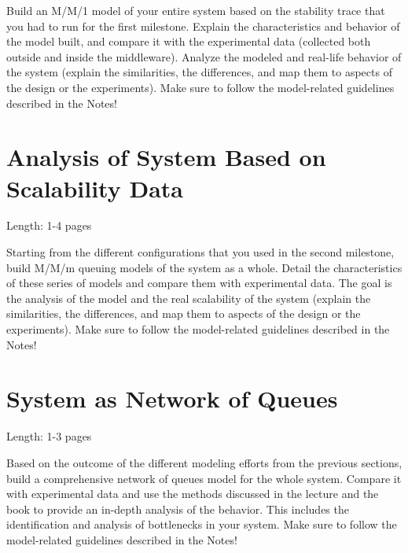 \documentclass[11pt]{article}
\begin{document}
Build an M/M/1 model of your entire system based on the stability trace that you had to run for the first milestone. Explain the characteristics and behavior of the model built, and compare it with the experimental data (collected both outside and inside the middleware). Analyze the modeled and real-life behavior of the system (explain the similarities, the differences, and map them to aspects of the design or the experiments). Make sure to follow the model-related guidelines described in the Notes!



\clearpage
\section{Analysis of System Based on Scalability Data}\label{sec:analysis-scalability}

Length: 1-4 pages

Starting from the different configurations that you used in the second milestone, build M/M/m queuing models of the system as a whole. Detail the characteristics of these series of models and compare them with experimental data. The goal is the analysis of the model and the real scalability of the system (explain the similarities, the differences, and map them to aspects of the design or the experiments). Make sure to follow the model-related guidelines described in the Notes!

\clearpage
\section{System as Network of Queues}\label{sec:network-of-queues}

Length: 1-3 pages

Based on the outcome of the different modeling efforts from the previous sections, build a comprehensive network of queues model for the whole system. Compare it with experimental data and use the methods discussed in the lecture and the book to provide an in-depth analysis of the behavior. This includes the identification and analysis of bottlenecks in your system. Make sure to follow the model-related guidelines described in the Notes!
\end{document}
